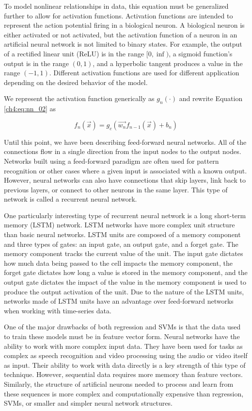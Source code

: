 To model nonlinear relationships in data, this equation must be generalized further to allow for activation functions. Activation functions are intended to represent the action potential firing in a biological neuron. A biological neuron is either activated or not activated, but the activation function of a neuron in an artificial neural network is not limited to binary states. For example, the output of a rectified linear unit (ReLU) is in the range $[0, \inf)$, a sigmoid function's output is in the range $(0, 1)$, and a hyperbolic tangent produces a value in the range $(-1, 1)$. Different activation functions are used for different application depending on the desired behavior of the model.

We represent the activation function generically as $g_n(\cdot)$ and rewrite Equation \ref{ch4:eq:nn_02} as

\begin{equation}
\label{ch4:eq:nn_03}
f_n(\vec{x}) = g_c \left( \vec{w_n} f_{n-1}(\vec{x})+ b_n \right)
\end{equation}

Until this point, we have been describing feed-forward neural networks. All of the connections flow in a single direction from the input nodes to the output nodes. Networks built using a feed-forward paradigm are often used for pattern recognition or other cases where a given input is associated with a known output. However, neural networks can also have connections that skip layers, link back to previous layers, or connect to other neurons in the same layer. This type of network is called a recurrent neural network.

One particularly interesting type of recurrent neural network is a long short-term memory (LSTM) network. LSTM networks have more complex unit structure than basic neural networks. LSTM units are composed of a memory component and three types of gates: an input gate, an output gate, and a forget gate. The memory component tracks the current value of the unit. The input gate dictates how much data being passed to the cell impacts the memory component, the forget gate dictates how long a value is stored in the memory component, and the output gate dictates the impact of the value in the memory component is used to produce the output activation of the unit. Due to the nature of the LSTM units, networks made of LSTM units have an advantage over feed-forward networks when working with time-series data. 

One of the major drawbacks of both regression and SVMs is that the data used to train these models must be in feature vector form. Neural networks have the ability to work with more complex input data. They have been used for tasks as complex as speech recognition and video processing using the audio or video itself as input. Their ability to work with data directly is a key strength of this type of technique. However, sequential data requires more memory than feature vectors. Similarly, the structure of artificial neurons needed to process and learn from these sequences is more complex and computationally expensive than regression, SVMs, or smaller and simpler neural network structures.



